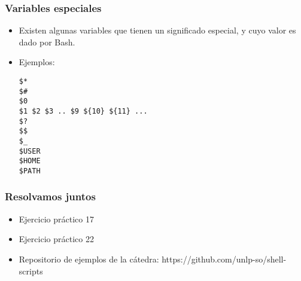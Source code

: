 \begin{frame}[fragile]
  \frametitle{Variables especiales}
  \begin{itemize}
    \item Existen algunas variables que tienen un significado especial, y cuyo valor es dado por Bash.
	  \item Ejemplos:
		\begin{lstlisting}
$*
$#
$0
$1 $2 $3 .. $9 ${10} ${11} ...
$?
$$
$_
$USER
$HOME
$PATH
		\end{lstlisting}
  \end{itemize}
\end{frame}

\begin{frame}
  \frametitle{Resolvamos juntos}
  \begin{itemize}
	  \item Ejercicio práctico 17
    \item Ejercicio práctico 22
    \item Repositorio de ejemplos de la cátedra: https://github.com/unlp-so/shell-scripts
  \end{itemize}
\end{frame}


